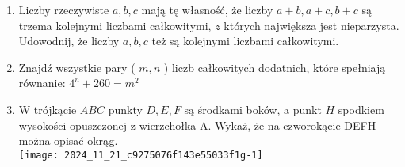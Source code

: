 \documentclass[10pt]{article}
\begin{document}
\begin{enumerate}
  \item Liczby rzeczywiste \(a, b, c\) mają tę własność, że liczby \(a+b, a+c, b+c\) są trzema kolejnymi liczbami całkowitymi, \(z\) których największa jest nieparzysta. Udowodnij, że liczby \(a, b, c\) też są kolejnymi liczbami całkowitymi.
  \item Znajdź wszystkie pary ( \(m, n\) ) liczb całkowitych dodatnich, które spełniają równanie: \(4^{n}+260=m^{2}\)
  \item W trójkącie \(A B C\) punkty \(D, E, F\) są środkami boków, a punkt \(H\) spodkiem wysokości opuszczonej z wierzchołka A. Wykaż, że na czworokącie DEFH można opisać okrąg.\\
\texttt{[image: 2024\_11\_21\_c9275076f143e55033f1g-1]}
\end{enumerate}
\end{document}
